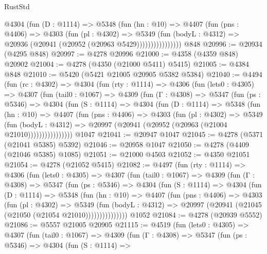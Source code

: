 \begin{lexlean}{RustStd}
\begin{coremodule}
                  @4304
                    (fun (D : @1114) =>
                    @5348
                      (fun (hn : @10) =>
                      @4407
                        (fun (pns : @4406) =>
                        @4303
                          (fun (pl : @4302) =>
                          @5349
                            (fun (bodyL : @4312) =>
                            @20936 (@20941 (@20952 (@20963 @5429))))))))))))))))
    @848
@20996 := @20934 (@4295 @848)
@20997 := @4278 @20996
@21000 := @4358 (@4359 @848) @20902
@21004 := @4278 (@4350 (@21000 @5411) @5415)
@21005 := @4384 @848
@21010 := @5420 (@5421 @21005 @20905 @5382 @5384)
@21040 := @4494
    (fun (rc : @4302) =>
    @4304
      (fun (rty : @1114) =>
      @4306
        (fun (lets0 : @4305) =>
        @4307
          (fun (tail0 : @1067) =>
          @4309
            (fun (Γ : @4308) =>
            @5347
              (fun (ps : @5346) =>
              @4304
                (fun (S : @1114) =>
                @4304
                  (fun (D : @1114) =>
                  @5348
                    (fun (hn : @10) =>
                    @4407
                      (fun (pns : @4406) =>
                      @4303
                        (fun (pl : @4302) =>
                        @5349
                          (fun (bodyL : @4312) =>
                          @20997 (@20941 (@20952 (@20963 (@21004 @21010))))))))))))))))
    @1047
@21041 := @20947 @1047
@21045 := @4278 (@5371 (@21041 @5385) @5392)
@21046 := @20958 @1047
@21050 := @4278 (@4409 (@21046 @5385) @1085)
@21051 := @21000 @4503
@21052 := @4350 @21051
@21054 := @4278 (@21052 @5415)
@21082 := @4497
    (fun (rty : @1114) =>
    @4306
      (fun (lets0 : @4305) =>
      @4307
        (fun (tail0 : @1067) =>
        @4309
          (fun (Γ : @4308) =>
          @5347
            (fun (ps : @5346) =>
            @4304
              (fun (S : @1114) =>
              @4304
                (fun (D : @1114) =>
                @5348
                  (fun (hn : @10) =>
                  @4407
                    (fun (pns : @4406) =>
                    @4303
                      (fun (pl : @4302) =>
                      @5349
                        (fun (bodyL : @4312) =>
                        @20997 (@20941 (@21045 (@21050 (@21054 @21010)))))))))))))))
    @1052
@21084 := @4278 (@20939 @5552)
@21086 := @5557 @21005 @20905
@21115 := @4519
    (fun (lets0 : @4305) =>
    @4307
      (fun (tail0 : @1067) =>
      @4309
        (fun (Γ : @4308) =>
        @5347
          (fun (ps : @5346) =>
          @4304
            (fun (S : @1114) =>

\end{coremodule}
\end{lexlean}
